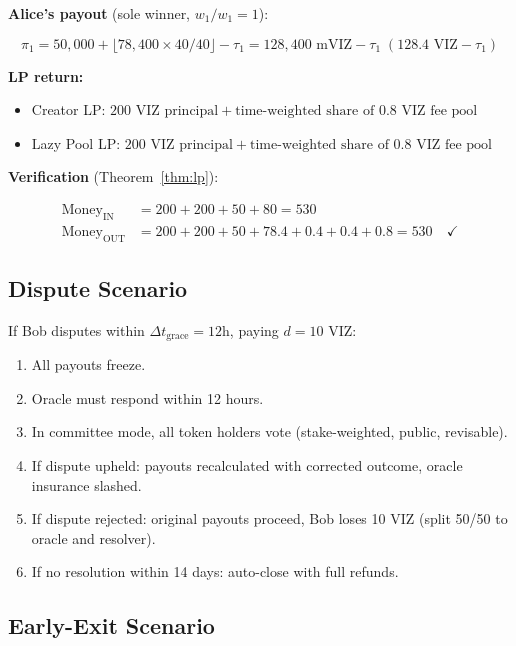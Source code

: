 \documentclass{ledger}
\theoremstyle{plain}
\theoremstyle{remark}
\begin{document}
\textbf{Alice's payout} (sole winner, $w_1 / w_1 = 1$):

\[
\pi_1 = 50{,}000 + \lfloor 78{,}400 \times 40/40 \rfloor - \tau_1 = 128{,}400
\text{ mVIZ} - \tau_1 \;(128.4 \text{ VIZ} - \tau_1)
\]

\textbf{LP return:}

\begin{itemize}
  \item Creator LP: $200 \text{ VIZ principal} + \text{time-weighted share of }
  0.8 \text{ VIZ fee pool}$
  \item Lazy Pool LP: $200 \text{ VIZ principal} + \text{time-weighted share of }
  0.8 \text{ VIZ fee pool}$
\end{itemize}

\textbf{Verification} (Theorem~\ref{thm:lp}):

\begin{align*}
\text{Money}_{\text{IN}} &= 200 + 200 + 50 + 80 = 530 \\
\text{Money}_{\text{OUT}} &= 200 + 200 + 50 + 78.4 + 0.4 + 0.4 + 0.8 = 530 \quad
\checkmark
\end{align*}

\subsection{Dispute Scenario}

If Bob disputes within $\Delta t_{\text{grace}} = 12\text{h}$, paying $d = 10$
VIZ:

\begin{enumerate}
  \item All payouts freeze.
  \item Oracle must respond within 12 hours.
  \item In committee mode, all token holders vote (stake-weighted, public,
  revisable).
  \item If dispute upheld: payouts recalculated with corrected outcome, oracle
  insurance slashed.
  \item If dispute rejected: original payouts proceed, Bob loses 10 VIZ (split
  50/50 to oracle and resolver).
  \item If no resolution within 14 days: auto-close with full refunds.
\end{enumerate}

\subsection{Early-Exit Scenario}\label{sec:exitexample}
\end{document}
